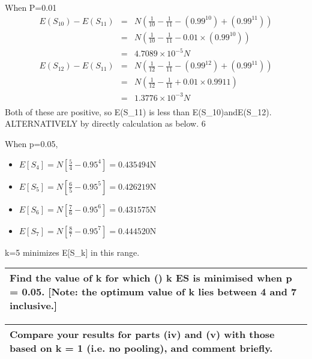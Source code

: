\documentclass[a4paper,12pt]{article}
\begin{document}
\item When P=0.01
\begin{eqnarray*}
E(S_{10}) - E(S_{11}) &=& N \left( \frac{1}{10} -  \frac{1}{11} - (0.99^{10}) + (0.99^{11}) \right)
\\&=& N\left( \frac{1}{10} - \frac{1}{11} - 0.01 \times (0.99^{10})\right) \\&=& 4.7089 \times 10^{-5}N
\end{eqnarray*}
\begin{eqnarray*}
E(S_{12}) - E(S_{11}) &=& N \left( \frac{1}{12} - \frac{1}{11} - (0.99^{12}) + (0.99^{11}) \right)\\&=& N \left( \frac{1}{12} - \frac{1}{11} + 0.01 \times 0.9911 \right) \\&=&
 1.3776 \times 10^{-3} N\\
\end{eqnarray*}
Both of these are positive, so E(S_{11}) is less than E(S_{10})andE(S_{12}).
ALTERNATIVELY by directly calculation as below.
6
\item When p=0.05,
\begin{itemize}
\item $E[S_{4}] = N[\frac{5}{4} - 0.95^4] = 0.435494$N
\item $E[S_{5}] = N[\frac{6}{5} - 0.95^5] = 0.426219$N
\item $E[S_{6}] = N[\frac{7}{6} - 0.95^6] = 0.431575$N
\item $E[S_{7}] = N[\frac{8}{7} - 0.95^7] = 0.444520$N
\end{itemize}

k=5 minimizes E[S_{k}] in this range.
\newpage
  \begin{table}[ht!]
     \centering
     \begin{tabular}{|p{15cm}|}
     \hline  Find the value of k for which () k ES is minimised when p = 0.05. [Note: the optimum value of k lies between 4 and 7 inclusive.] 
\\ \hline
      \end{tabular}
    \end{table}
    
  \begin{table}[ht!]
     \centering
     \begin{tabular}{|p{15cm}|}
     \hline   Compare your results for parts (iv) and (v) with those based on k = 1 (i.e. no pooling), and comment briefly. 
\\ \hline
      \end{tabular}
    \end{table}
    
\end{document}
